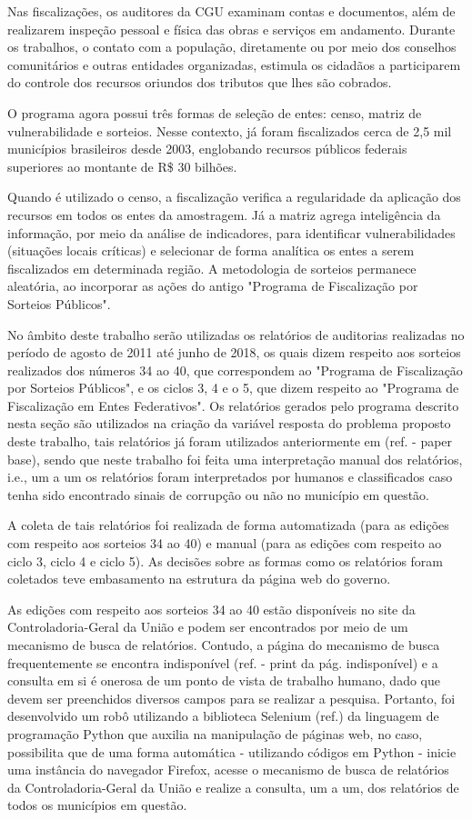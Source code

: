 Nas fiscalizações, os auditores da CGU examinam contas e documentos, além de realizarem inspeção pessoal e física das obras e serviços em andamento. Durante os trabalhos, o contato com a população, diretamente ou por meio dos conselhos comunitários e outras entidades organizadas, estimula os cidadãos a participarem do controle dos recursos oriundos dos tributos que lhes são cobrados.

O programa agora possui três formas de seleção de entes: censo, matriz de vulnerabilidade e sorteios. Nesse contexto, já foram fiscalizados cerca de 2,5 mil municípios brasileiros desde 2003, englobando recursos públicos federais superiores ao montante de R\$ 30 bilhões.

Quando é utilizado o censo, a fiscalização verifica a regularidade da aplicação dos recursos em todos os entes da amostragem. Já a matriz agrega inteligência da informação, por meio da análise de indicadores, para identificar vulnerabilidades (situações locais críticas) e selecionar de forma analítica os entes a serem fiscalizados em determinada região. A metodologia de sorteios permanece aleatória, ao incorporar as ações do antigo "Programa de Fiscalização por Sorteios Públicos".

No âmbito deste trabalho serão utilizadas os relatórios de auditorias realizadas no período de agosto de 2011 até junho de 2018, os quais dizem respeito aos sorteios realizados dos números 34 ao 40, que correspondem ao "Programa de Fiscalização por Sorteios Públicos", e os ciclos 3, 4 e o 5, que dizem respeito ao "Programa de Fiscalização em Entes Federativos". Os relatórios gerados pelo programa descrito nesta seção são utilizados na criação da variável resposta do problema proposto deste trabalho, tais relatórios já foram utilizados anteriormente em (ref. - paper base), sendo que neste trabalho foi feita uma interpretação manual dos relatórios, i.e., um a um os relatórios foram interpretados por humanos e classificados caso tenha sido encontrado sinais de corrupção ou não no município em questão.

A coleta de tais relatórios foi realizada de forma automatizada (para as edições com respeito aos sorteios 34 ao 40) e manual (para as edições com respeito ao ciclo 3, ciclo 4 e ciclo 5). As decisões sobre as formas como os relatórios foram coletados teve embasamento na estrutura da página web do governo.

As edições com respeito aos sorteios 34 ao 40 estão disponíveis no site da Controladoria-Geral da União e podem ser encontrados por meio de um mecanismo de busca de relatórios. Contudo, a página do mecanismo de busca frequentemente se encontra indisponível (ref. - print da pág. indisponível) e a consulta em si é onerosa de um ponto de vista de trabalho humano, dado que devem ser preenchidos diversos campos para se realizar a pesquisa. Portanto, foi desenvolvido um robô utilizando a biblioteca Selenium (ref.) da linguagem de programação Python que auxilia na manipulação de páginas web, no caso, possibilita que de uma forma automática - utilizando códigos em Python - inicie uma instância do navegador Firefox, acesse o mecanismo de busca de relatórios da Controladoria-Geral da União e realize a consulta, um a um, dos relatórios de todos os municípios em questão.

